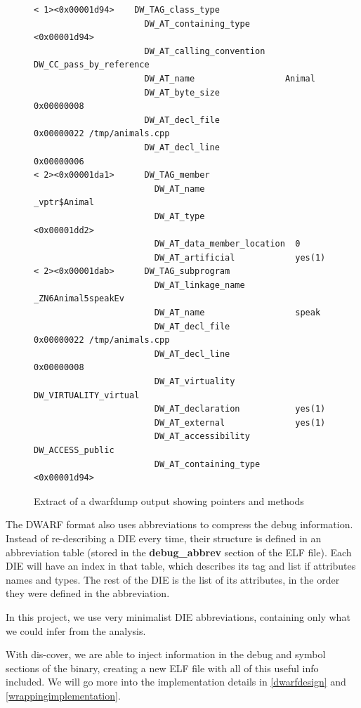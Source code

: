 \documentclass[a4paper,11pt,oneside]{report}
\begin{document}
\begin{figure}[h]
\begin{lstlisting}
< 1><0x00001d94>    DW_TAG_class_type
                      DW_AT_containing_type       <0x00001d94>
                      DW_AT_calling_convention    DW_CC_pass_by_reference
                      DW_AT_name                  Animal
                      DW_AT_byte_size             0x00000008
                      DW_AT_decl_file             0x00000022 /tmp/animals.cpp
                      DW_AT_decl_line             0x00000006
< 2><0x00001da1>      DW_TAG_member
                        DW_AT_name                  _vptr$Animal
                        DW_AT_type                  <0x00001dd2>
                        DW_AT_data_member_location  0
                        DW_AT_artificial            yes(1)
< 2><0x00001dab>      DW_TAG_subprogram
                        DW_AT_linkage_name          _ZN6Animal5speakEv
                        DW_AT_name                  speak
                        DW_AT_decl_file             0x00000022 /tmp/animals.cpp
                        DW_AT_decl_line             0x00000008
                        DW_AT_virtuality            DW_VIRTUALITY_virtual
                        DW_AT_declaration           yes(1)
                        DW_AT_external              yes(1)
                        DW_AT_accessibility         DW_ACCESS_public
                        DW_AT_containing_type       <0x00001d94>
\end{lstlisting}
\caption{Extract of a dwarfdump output showing pointers and methods}
\label{dwarfdies}
\end{figure}

The DWARF format also uses abbreviations to compress the debug information.
Instead of re-describing a DIE every time, their structure is defined in an
abbreviation table (stored in the \textbf{debug\_abbrev} section of the ELF
file).
Each DIE will have an index in that table, which describes its tag and list
if attributes names and types. The rest of the DIE is the list of its
attributes, in the order they were defined in the abbreviation.

In this project, we use very minimalist DIE abbreviations, containing only
what we could infer from the analysis.

With dis-cover, we are able to inject information in the debug and symbol 
sections of the binary, creating a new ELF file with all of this useful info 
included.
We will go more into the implementation details in \autoref{dwarfdesign} and
\autoref{wrappingimplementation}.
\end{document}
